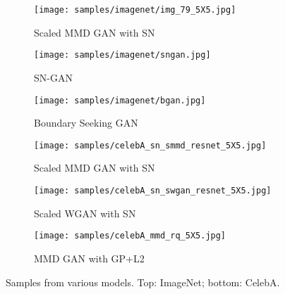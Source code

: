 \documentclass{article}
\begin{document}
\begin{figure}[p]
    \centering
    \begin{subfigure}[t]{0.30\textwidth}
        \centering
        \texttt{[image: samples/imagenet/img\_79\_5X5.jpg]}
        \caption{Scaled MMD GAN with SN}
        \label{fig:imagenet_sn_smmd}
    \end{subfigure}
    \hfill
    \begin{subfigure}[t]{0.30\textwidth}
        \centering
        \texttt{[image: samples/imagenet/sngan.jpg]}
        \caption{SN-GAN} \label{fig:imagenet_sngan}
    \end{subfigure}
    \hfill
    \begin{subfigure}[t]{0.30\textwidth}
        \centering
        \texttt{[image: samples/imagenet/bgan.jpg]}
        \caption{Boundary Seeking GAN} \label{fig:imagenet_bgan}
    \end{subfigure}


    \begin{subfigure}[t]{0.30\textwidth}
        \centering
        \texttt{[image: samples/celebA\_sn\_smmd\_resnet\_5X5.jpg]}
        \caption{Scaled MMD GAN with SN} \label{fig:celebA_sn_smmd}
    \end{subfigure}
    \hfill
    \begin{subfigure}[t]{0.30\textwidth}
        \centering
        \texttt{[image: samples/celebA\_sn\_swgan\_resnet\_5X5.jpg]}
        \caption{Scaled WGAN with SN} \label{fig:celebA_sn_swgan}
    \end{subfigure}
    \hfill
    \begin{subfigure}[t]{0.30\textwidth}
        \centering
        \texttt{[image: samples/celebA\_mmd\_rq\_5X5.jpg]}
        \caption{MMD GAN with GP+L2} \label{fig:celebA_mmd_gp}
    \end{subfigure}
    \caption{Samples from various models. Top:  ImageNet; bottom:  CelebA.}
\label{fig:samples}
\end{figure}
\end{document}
